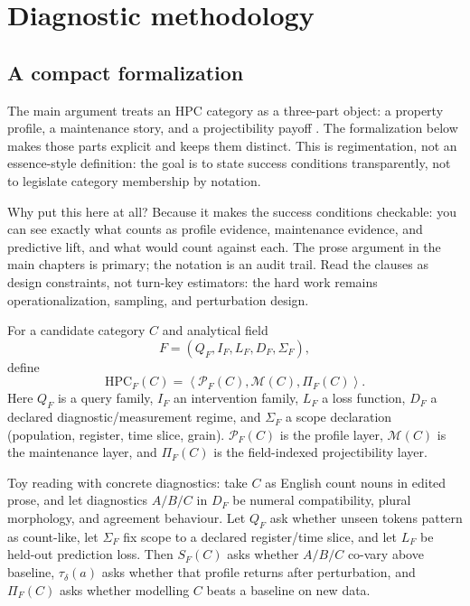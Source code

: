 \chapter{Diagnostic methodology}
\label{app:diagnostics}


\section{A compact formalization}
\label{sec:app:compact-formalization}

The main argument treats an HPC category as a three-part object: a property profile, a maintenance story, and a projectibility payoff \parencite{boyd1991}. The formalization below makes those parts explicit and keeps them distinct. This is regimentation, not an essence-style definition: the goal is to state success conditions transparently, not to legislate category membership by notation.

Why put this here at all? Because it makes the success conditions checkable: you can see exactly what counts as profile evidence, maintenance evidence, and predictive lift, and what would count against each. The prose argument in the main chapters is primary; the notation is an audit trail.
Read the clauses as design constraints, not turn-key estimators: the hard work remains operationalization, sampling, and perturbation design.

For a candidate category $C$ and analytical field
\[
F=(Q_F,I_F,L_F,D_F,\Sigma_F),
\]
define
\[
\mathrm{HPC}_F(C)=\left\langle \mathcal{P}_F(C),\mathcal{M}(C),\Pi_F(C)\right\rangle .
\]
Here $Q_F$ is a query family, $I_F$ an intervention family, $L_F$ a loss function, $D_F$ a declared diagnostic/measurement regime, and $\Sigma_F$ a scope declaration (population, register, time slice, grain). $\mathcal{P}_F(C)$ is the profile layer, $\mathcal{M}(C)$ is the maintenance layer, and $\Pi_F(C)$ is the field-indexed projectibility layer.

Toy reading with concrete diagnostics: take $C$ as English count nouns in edited prose, and let diagnostics $A/B/C$ in $D_F$ be numeral compatibility, plural morphology, and agreement behaviour. Let $Q_F$ ask whether unseen tokens pattern as count-like, let $\Sigma_F$ fix scope to a declared register/time slice, and let $L_F$ be held-out prediction loss. Then $S_F(C)$ asks whether $A/B/C$ co-vary above baseline, $\tau_{\delta}(a)$ asks whether that profile returns after perturbation, and $\Pi_F(C)$ asks whether modelling $C$ beats a baseline on new data.


